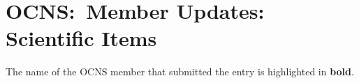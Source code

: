\section*{OCNS:\ Member Updates: Scientific Items}%

\noindent{}The name of the OCNS member that submitted the entry is highlighted in \textbf{bold}.

\nocite{*}
\printbibliography[heading=none]

